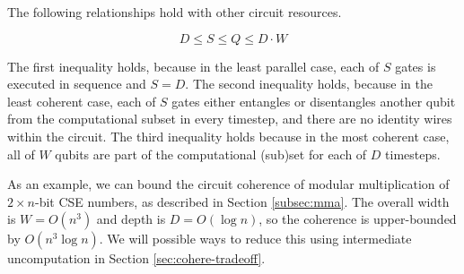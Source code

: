 The following relationships hold with other circuit resources.

\begin{equation}
D \le S \le Q \le D\cdot W
\end{equation}

The first inequality holds, because in the least parallel case, each of $S$ gates is executed in sequence
and $S=D$. The second inequality holds, because in the least coherent case, each of $S$ gates
either entangles or disentangles another qubit from the computational subset in every timestep, and
there are no identity wires within the circuit. The third inequality holds because in the
most coherent case, all of $W$ qubits are part of the computational (sub)set for each of $D$ timesteps.

As an example, we can bound the circuit coherence of modular multiplication of $2\times n$-bit
CSE numbers, as described in Section \ref{subsec:mma}. The overall width is $W = O(n^3)$ and
depth is $D=O(\log n)$, so the coherence is upper-bounded by $O(n^3\log n)$. We will possible
ways to reduce this using intermediate uncomputation in Section \ref{sec:cohere-tradeoff}.